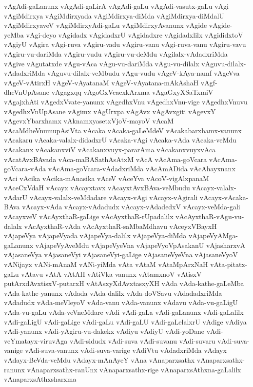 {vAgAdi-gaLanunx
vAgAdi-gaLirA
vAgAdi-gaLu
vAgAdi-vasutx-gaLu
vAgi
vAgiMdirxya
vAgiMdirxyada
vAgiMdirxya-diMda
vAgiMdirxya-diMdalU
vAgiMdirxyaveV
vAgiMdirxyAdi-gaLu
vAgiMdirxyAvanunx
vAgide
vAgide-yeMba
vAgi-deyo
vAgidadx
vAgidadxrU
vAgidadxre
vAgidadxlilx
vAgididxtoV
vAgiyU
vAgira
vAgi-ruva
vAgiru-vadu
vAgiru-vanu
vAgi-ruva-vanu
vAgiru-vavu
vAgiru-vu-dariMda
vAgiru-vudu
vAgiru-vu-deMdu
vAgilalx-vAdadxriMda
vAgive
vAgutatxde
vAgu-vAca
vAgu-vu-dariMda
vAgu-vu-dilalx
vAguvu-dilalx-vAdadxriMda
vAguvu-dilalx-veMbudu
vAgu-vudu
vAgeV-kAya-namf
vAgeVva
vAgeV-vAtirxH
vAgeV-vAyatanaM
vAgeV-vAyatana-mAkAshaH
vAgf-dheVnUpAsane
vAgagxqq
vAgoGxVcacxkArxma
vAgaGxyXSaTxmiV
vAgajxhAti
vAgedxVvate-yanunx
vAgedhxVnu
vAgedhxVnu-vige
vAgedhxVnuvu
vAgedhxVnUpAsane
vAgimx
vAgUrxpa
vAgAvx
vAgAvxgiti
vAgevxY
vAgevxYbarxhamx
vAknamxyasetxVjoV-mayoV
vAcaM
vAcaMdheVnumupAsiVta
vAcaka
vAcaka-gaLeMdeV
vAcakabarxhamx-vanunx
vAcakaru
vAcaka-valalx-didadxrU
vAcaka-vAgi
vAcaka-vAda
vAcaka-veMdu
vAcakanx
vAcakanxviV
vAcakanxvuyx-pararAma
vAcakanxvuyxvAca
vAcatAvxBAvada
vAca-maBASathAsAtxM
vAcA
vAcAma-goVcara
vAcAma-goVcara-vAda
vAcAma-goVcara-vAdadxriMda
vAcAmADida
vAcAhayxnanx
vAci
vAcika
vAcika-mAnasika
vAceV
vAceYva
vAcoV-vigAlxpanaM
vAceCxVdaH
vAcayx
vAcayxtavx
vAcayxtAvxBAva-veMbudu
vAcayx-valalx-vAdarU
vAcayx-valalx-veMdadare
vAcayx-vAgi
vAcayx-vAgirali
vAcayx-vAcaka-BAva
vAcayx-vAda
vAcayx-vAdadudx
vAcayx-vAdadedxV
vAcayx-veMda-gali
vAcayxveV
vAcAyxthaR-gaLige
vAcAyxthaR-rUpadalilx
vAcAyxthaR-vAgu-vu-dalalx
vAcAyxthaR-vAda
vAcAyxthaR-saMbaMdhavu
vAceyxVBayxH
vAjapeVya
vAjapeVyada
vAjapeVya-dalilx
vAjapeVya-diMda
vAjapeVyAMga-gaLanunx
vAjapeVyAveMdu
vAjapeVyeVna
vAjapeVyoVpAsakanU
vAjasharxvA
vAjasaneVya
vAjasaneVyi
vAjasaneVyi-gaLige
vAjasaneVyeVna
vAjasaneVyoV
vANijayx
vANi-mAnaM
vANi-yiMda
vAta
vAtaM
vAtaMpArxNaH
vAta-pitatx-gaLu
vAtavu
vAtA
vAtAH
vAtiVka-vanunx
vAtamxnoV
vAtisxV-putArxdAvxtisxV-putarxH
vAtAsxyXdAvxtasxyXH
vAda
vAda-kathe-gaLeMba
vAda-kathe-yanunx
vAdada
vAda-dalilx
vAda-doVSavu
vAdadadxriMda
vAdadudx
vAda-meVleyoV
vAda-vanu
vAda-vanunx
vAdavu
vAda-vu-gaLigU
vAda-vu-gaLu
vAda-veVneMdare
vAdi
vAdi-gaLa
vAdi-gaLanunx
vAdi-gaLalilx
vAdi-gaLigU
vAdi-gaLige
vAdi-gaLu
vAdi-gaLU
vAdi-gaLelalxrU
vAdige
vAdiya
vAdi-yanunx
vAdi-yAgiru-vu-dakekx
vAdiyu
vAdiyU
vAdi-yoDane
vAdi-veYmatayx-viruvAga
vAdi-sidudx
vAdi-suva
vAdi-suvanu
vAdi-suvaru
vAdi-suva-vanige
vAdi-suva-vanunx
vAdi-suva-varige
vAdiVtu
vAdadxriMda
vAdayx
vAdayx-BeVda-veMdu
vAdayx-mAnAyeY
vAna
vAnaparxsathx
vAnaparxsathx-ranunx
vAnaparxsathx-ranUnx
vAnaparxsathx-rige
vAnaparxsAthxna-gaLalilx
vAnaparxsAthxsharxma
}

